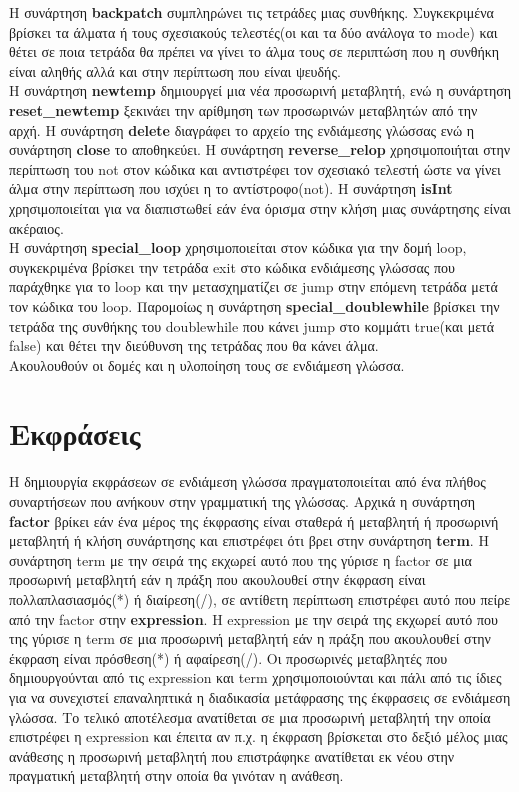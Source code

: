 \documentclass[12pt,a4paper,a4paper]{report}
\begin{document}
Η συνάρτηση  \textbf{backpatch} συμπληρώνει τις τετράδες μιας συνθήκης. Συγκεκριμένα βρίσκει τα άλματα ή τους σχεσιακούς τελεστές(οι και τα δύο ανάλογα το mode) και θέτει σε ποια τετράδα θα πρέπει να γίνει το άλμα τους σε περιπτώση που η συνθήκη είναι αληθής αλλά και στην περίπτωση που είναι ψευδής.\\
Η συνάρτηση  \textbf{newtemp} δημιουργεί μια νέα προσωρινή μεταβλητή, ενώ η συνάρτηση \textbf{reset\_newtemp} ξεκινάει την αρίθμηση των προσωρινών μεταβλητών από την αρχή. Η συνάρτηση \textbf{delete} διαγράφει το αρχείο της ενδιάμεσης γλώσσας ενώ η συνάρτηση \textbf{close} το αποθηκεύει. Η συνάρτηση \textbf{reverse\_relop} χρησιμοποιήται στην περίπτωση του not στον κώδικα και αντιστρέφει τον σχεσιακό τελεστή ώστε να γίνει άλμα στην περίπτωση που ισχύει η το αντίστροφο(not). H συνάρτηση \textbf{isInt} χρησιμοποιείται για να διαπιστωθεί εάν ένα όρισμα στην κλήση μιας συνάρτησης είναι ακέραιος.\\
Η συνάρτηση \textbf{special\_loop} χρησιμοποιείται στον κώδικα για την δομή loop, συγκεκριμένα βρίσκει την τετράδα exit στο κώδικα ενδιάμεσης γλώσσας που παράχθηκε για το loop και την μετασχηματίζει σε jump στην επόμενη τετράδα μετά τον κώδικα του loop. Παρομοίως η συνάρτηση \textbf{special\_doublewhile} βρίσκει την τετράδα της συνθήκης του doublewhile που κάνει jump στο κομμάτι true(και μετά false) και θέτει την διεύθυνση της τετράδας που θα κάνει άλμα.\\
Ακουλουθούν οι δομές και η υλοποίηση τους σε ενδιάμεση γλώσσα.\\

\section{Εκφράσεις}
H δημιουργία εκφράσεων σε ενδιάμεση γλώσσα πραγματοποιείται από ένα πλήθος συναρτήσεων που ανήκουν στην γραμματική της γλώσσας. Αρχικά η συνάρτηση \textbf{factor} βρίκει εάν ένα μέρος της έκφρασης είναι σταθερά ή μεταβλητή ή προσωρινή μεταβλητή ή κλήση συνάρτησης και επιστρέφει ότι βρει στην συνάρτηση \textbf{term}. Η συνάρτηση term με την σειρά της εκχωρεί αυτό που της γύρισε η factor σε μια προσωρινή μεταβλητή εάν η πράξη που ακουλουθεί στην έκφραση είναι πολλαπλασιασμός(*) ή διαίρεση(/), σε αντίθετη περίπτωση επιστρέφει αυτό που πείρε από την factor στην \textbf{expression}. H expression με την σειρά της εκχωρεί αυτό που της γύρισε η term σε μια προσωρινή μεταβλητή εάν η πράξη που ακουλουθεί στην έκφραση είναι πρόσθεση(*) ή αφαίρεση(/). Οι προσωρινές μεταβλητές που δημιουργούνται από τις expression και term χρησιμοποιούνται και πάλι από τις ίδιες για να συνεχιστεί επαναληπτικά η διαδικασία μετάφρασης της έκφρασεις σε ενδιάμεση γλώσσα. Το τελικό αποτέλεσμα ανατίθεται σε μια προσωρινή μεταβλητή την οποία επιστρέφει η expression και έπειτα αν π.χ. η έκφραση βρίσκεται στο δεξιό μέλος μιας ανάθεσης η προσωρινή μεταβλητή που επιστράφηκε ανατίθεται εκ νέου στην πραγματική μεταβλητή στην οποία θα γινόταν η ανάθεση.
\end{document}
